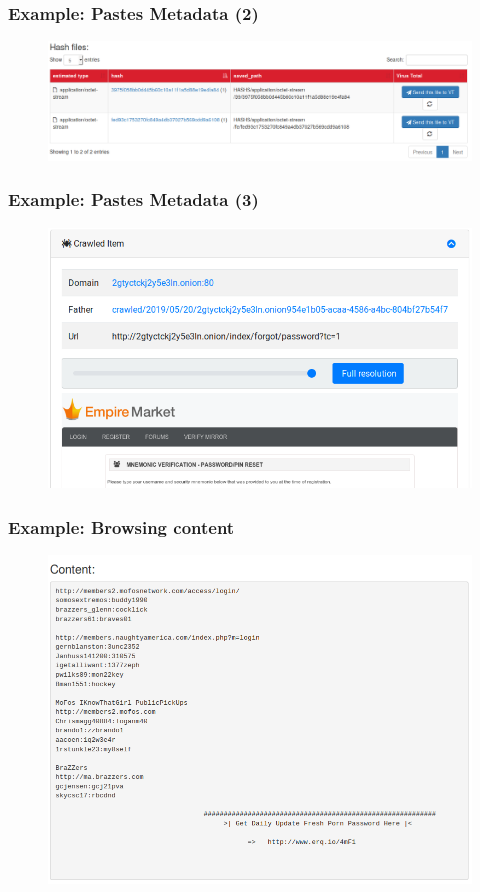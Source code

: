 \begin{frame}
    \frametitle{Example: Pastes Metadata (2)}
    \begin{figure}
        \includegraphics[scale=0.28, angle=0]{images/ail_16.png}
    \end{figure}
\end{frame}

\begin{frame}
    \frametitle{Example: Pastes Metadata (3)}
    \begin{figure}
        \includegraphics[scale=0.28, angle=0]{images/ail_17.png}
    \end{figure}
\end{frame}

\begin{frame}
    \frametitle{Example: Browsing content}
    \begin{figure}
        \includegraphics[scale=0.3, angle=0]{images/ail_04.png}
    \end{figure}
\end{frame}


